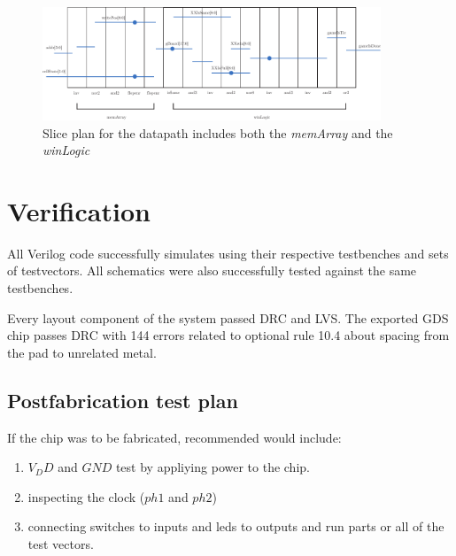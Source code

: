 \documentclass[]{article}
\begin{document}
\begin{figure}
\centering
\includegraphics[width=0.9\textwidth]{sliceplan.pdf}
\caption{Slice plan for the datapath includes both the \emph{memArray} and the \emph{winLogic}}
\label{fig:sliceplan}
\end{figure}



\section{Verification}
\label{sec:verification}

All Verilog code successfully simulates using their respective testbenches and sets of testvectors. All schematics were also successfully tested against the same testbenches.

Every layout component of the system passed DRC and LVS. The exported GDS chip passes DRC with 144 errors related to optional rule 10.4 about spacing from the pad to unrelated metal. 

\subsection{Postfabrication test plan}
If the chip was to be fabricated, recommended would include:
\begin{enumerate}
\item $V_DD$ and $GND$ test by appliying power to the chip.
\item inspecting the clock ($ph1$ and $ph2$)
\item connecting switches to inputs and leds to outputs and run parts or all of the test vectors.
\end{enumerate}
\end{document}

